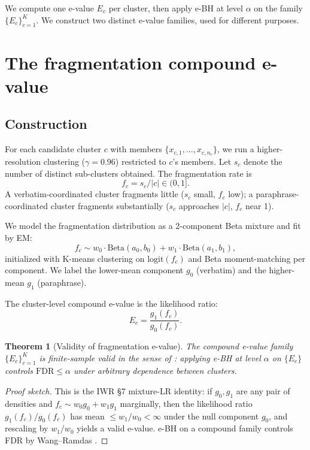 \documentclass{article}
\newtheorem{theorem}{Theorem}
\theoremstyle{definition}
\theoremstyle{remark}
\begin{document}
We compute one e-value $E_c$ per cluster, then apply e-BH at level $\alpha$ on the family $\{E_c\}_{c=1}^K$. We construct two distinct e-value families, used for different purposes.

\section{The fragmentation compound e-value}
\label{sec:fragmentation}

\subsection{Construction}

For each candidate cluster $c$ with members $\{x_{c,1}, \ldots, x_{c,n_c}\}$, we run a higher-resolution clustering ($\gamma = 0.96$) restricted to $c$'s members. Let $s_c$ denote the number of distinct sub-clusters obtained. The fragmentation rate is
\begin{equation}
f_c = s_c / |c| \in (0, 1].
\end{equation}
A verbatim-coordinated cluster fragments little ($s_c$ small, $f_c$ low); a paraphrase-coordinated cluster fragments substantially ($s_c$ approaches $|c|$, $f_c$ near 1).

We model the fragmentation distribution as a 2-component Beta mixture and fit by EM:
\begin{equation}
f_c \sim w_0 \cdot \mathrm{Beta}(a_0, b_0) + w_1 \cdot \mathrm{Beta}(a_1, b_1),
\end{equation}
initialized with K-means clustering on $\mathrm{logit}(f_c)$ and Beta moment-matching per component. We label the lower-mean component $g_0$ (verbatim) and the higher-mean $g_1$ (paraphrase).

The cluster-level compound e-value is the likelihood ratio:
\begin{equation}
E_c = \frac{g_1(f_c)}{g_0(f_c)}.
\end{equation}

\begin{theorem}[Validity of fragmentation e-value]
\label{thm:fragvalidity}
The compound e-value family $\{E_c\}_{c=1}^K$ is finite-sample valid in the sense of \citet{iwr2024}: applying e-BH at level $\alpha$ on $\{E_c\}$ controls $\mathrm{FDR} \le \alpha$ under arbitrary dependence between clusters.
\end{theorem}

\begin{proof}[Proof sketch]
This is the IWR \S 7 mixture-LR identity: if $g_0, g_1$ are any pair of densities and $f_c \sim w_0 g_0 + w_1 g_1$ marginally, then the likelihood ratio $g_1(f_c)/g_0(f_c)$ has mean $\le w_1/w_0 < \infty$ under the null component $g_0$, and rescaling by $w_1/w_0$ yields a valid e-value. e-BH on a compound family controls FDR by Wang--Ramdas \citeyearpar{wangramdas2022}.
\end{proof}
\end{document}
